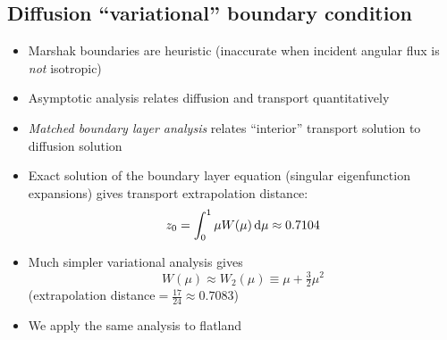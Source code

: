 \documentclass{beamer}
\begin{document}
\subsection{Diffusion ``variational'' boundary condition}
\begin{frame}
  \begin{itemize}
    \item Marshak boundaries are heuristic (inaccurate when incident angular
      flux is \emph{not} isotropic)
    \item Asymptotic analysis relates diffusion and transport quantitatively
    \item \emph{Matched boundary layer analysis} relates ``interior'' transport
      solution to diffusion solution
    \item Exact solution of the boundary layer equation (singular eigenfunction
      expansions)
      gives transport extrapolation distance:
      \begin{equation*}
        z_0 = \int_{0}^{1} \mu W(\mu) \mathop{}\!\mathrm{d}\mu
        \approx 0.7104
      \end{equation*}
    \item Much simpler variational analysis \cite{Mal1991} gives
      \begin{equation*}
        W(\mu) \approx  W_2(\mu) \equiv \mu + \tfrac{3}{2} \mu^2  
      \end{equation*}
      (extrapolation distance${}= \tfrac{17}{24}
      \approx 0.7083$)
    \item We apply the same analysis to flatland
  \end{itemize}
\end{frame}
\end{document}

